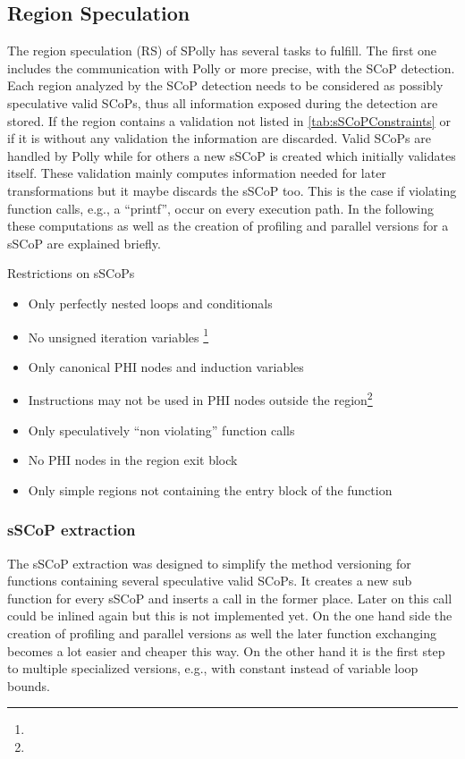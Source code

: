 \subsection{Region Speculation}
The region speculation (RS) of SPolly has several tasks to fulfill. The first 
one includes the communication with Polly or more precise, 
with the SCoP detection. Each region analyzed by the SCoP detection needs to be
considered as possibly speculative valid SCoPs, thus all information exposed 
during the detection are stored. If the region contains a validation not 
listed in \ref{tab:sSCoPConstraints} or if it is without any validation
the information are discarded. Valid SCoPs are handled by Polly while for others
a new sSCoP is created which initially validates itself. 
These validation mainly computes information needed for later
transformations but it maybe discards the sSCoP too. This is the case if 
violating function calls, e.g., a ``printf'', occur on every execution path. 
In the following these computations as well as the creation of 
profiling and parallel versions for a sSCoP are explained briefly. 


\begin{table}[htbp]
  \centering
  \caption{Restrictions on sSCoPs}
    \begin{itemize}
      \item Only perfectly nested loops and conditionals
      \item No unsigned iteration variables \footnote{}
      \item Only canonical PHI nodes and induction variables
      \item Instructions may not be used in PHI nodes outside the region\footnote{}
      \item Only speculatively ``non violating'' function calls
      \item No PHI nodes in the region exit block
      \item Only simple regions not containing the entry block of the function
    \end{itemize}
  \label{tab:sSCoPConstraints}
\end{table}


\subsubsection{sSCoP extraction}
The sSCoP extraction was designed to simplify the method versioning for functions 
containing several speculative valid SCoPs. It creates a new sub function for 
every sSCoP and inserts a call in the former place. Later on this call could be
inlined again but this is not implemented yet. On the one hand side the creation 
of profiling and parallel versions as well the later function exchanging becomes
a lot easier and cheaper this way. On the other hand it is the first step to 
multiple specialized versions, e.g., with constant instead of variable loop 
bounds.




